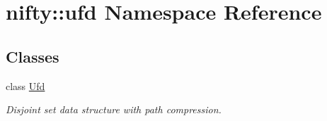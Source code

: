 \hypertarget{namespacenifty_1_1ufd}{}\section{nifty\+:\+:ufd Namespace Reference}
\label{namespacenifty_1_1ufd}
\subsection*{Classes}
\begin{DoxyCompactItemize}
\item 
class \hyperlink{classnifty_1_1ufd_1_1Ufd}{Ufd}
\begin{DoxyCompactList}\small\item\em Disjoint set data structure with path compression. \end{DoxyCompactList}\end{DoxyCompactItemize}
